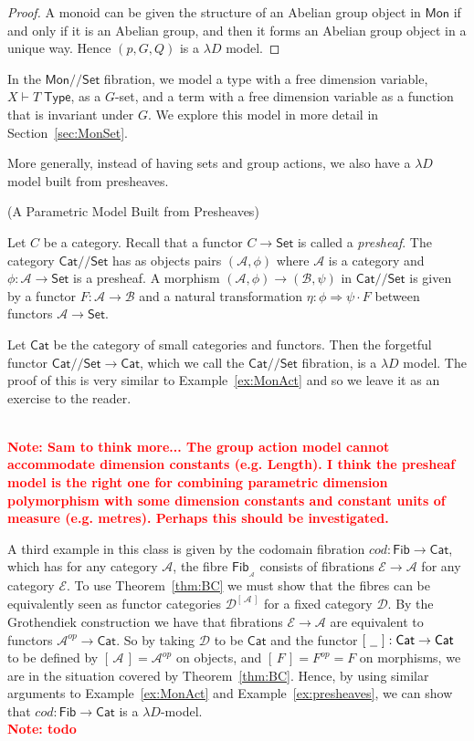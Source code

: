 \documentclass[a4paper,UKenglish]{lipics}
\newcommand\note[1]{{ \bf \textcolor{red} {\vspace{2mm}\; \\ Note: #1\\}}}
\newcommand{\msf}[1]{\mathsf{#1}} %
\newcommand{\Mon}{\msf{Mon}}
\newcommand{\Set}{\msf{Set}}
\newcommand{\Cat}{\msf{Cat}}
\newcommand{\Fib}{\msf{Fib}}
\newcommand{\A}{\mathcal{A}}
\newcommand{\B}{\mathcal{B}}
\newcommand{\D}{\mathcal{D}}
\newcommand{\E}{\mathcal{E}}
\newcommand{\fibre}[2]{#1_{_{#2}}}
\newcommand{\blank}{\, \underline{\hspace{2mm}} \,}
\newcommand{\SqFun}[1][\blank]{[\, #1 \, ]} %
\newcommand{\GroupSet}[1]{#1/\!/\Set}
\newcommand{\MonSet}{\GroupSet{\Mon}}
\newcommand{\CatSet}{\GroupSet{\Cat}}
\newcommand{\Tj}[2]{#1 \vdash #2 \; \msf{ Type}}
\newcommand{\Dvar}{X}
\begin{document}
\begin{example}
\begin{proof}
A monoid can be given the structure of an Abelian group object in $\Mon$ if and only if it is an Abelian group, and then it forms an Abelian group object in a unique way. Hence $(p,G,Q)$ is a $\lambda D$ model.
\end{proof}

In the $\MonSet$ fibration, we model a type with a free dimension variable, $\Tj\Dvar T$, as a $G$-set, and a term with a free dimension variable as a function that is invariant under $G$. We explore this model in more detail in Section~\ref{sec:MonSet}.
\end{example}

More generally, instead of having sets and group actions, we also have a $\lambda D$ model built from presheaves.

\begin{example}(A Parametric Model Built from Presheaves)
\label{ex:presheaves}

Let $C$ be a category. Recall that a functor $C\to\Set$ is called a \emph{presheaf}. The category $\CatSet$ has as objects pairs $(\A,\phi)$ where $\A$ is a category and $\phi:\A\to\Set$ is a presheaf. A morphism $(\A,\phi) \rightarrow (\B,\psi)$ in $\CatSet$ is given by a functor $F:\A\rightarrow \B$ and a natural transformation $\eta:\phi \Rightarrow \psi \cdot F$ between functors $\A \to\Set$.

Let $\Cat$ be the category of small categories and functors. Then the forgetful functor $\CatSet\to \Cat$, which we call the $\CatSet$ fibration, is a $\lambda D$ model. The proof of this is very similar to Example~\ref{ex:MonAct} and so we leave it as an exercise to the reader.
\end{example}

\note{Sam to think more... The group action model cannot accommodate dimension constants (e.g. Length). I think the presheaf model is the right one for combining parametric dimension polymorphism with
some dimension constants and constant units of measure (e.g. metres).
Perhaps this should be investigated.}

\begin{example}\label{ex:fibrations}
A third example in this class is given by the codomain fibration $cod: \Fib \rightarrow \Cat$, which has for any category $\A$, the fibre $\fibre{\Fib}{\A}$ consists of fibrations $\E \rightarrow \A$ for any category $\E$. To use Theorem~\ref{thm:BC} we must show that the fibres can be equivalently seen as functor categories $\mathcal{D}^{\SqFun[\A]}$ for a fixed category $\D$. By the Grothendiek construction we have that fibrations $\E \rightarrow \A$ are equivalent to functors $\A^{op} \rightarrow \Cat$. So by taking $\D$ to be $\Cat$ and the functor $\SqFun[\blank]:\Cat \rightarrow \Cat$ to be defined by $\SqFun[\A] = \A^{op}$ on objects, and $\SqFun[F] = F^{op} = F$ on morphisms, we are in the situation covered by Theorem~\ref{thm:BC}. Hence, by using similar arguments to Example~\ref{ex:MonAct} and Example~\ref{ex:presheaves}, we can show that $cod:\Fib \rightarrow \Cat$ is a $\lambda D$-model.
\note{todo}
\end{example}
\end{document}
